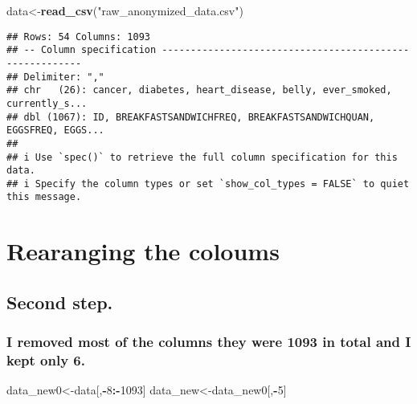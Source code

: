 \documentclass[
]{article}
\newenvironment{Shaded}{\begin{snugshade}}{\end{snugshade}}
\newcommand{\DecValTok}[1]{\textcolor[rgb]{0.00,0.00,0.81}{#1}}
\newcommand{\FunctionTok}[1]{\textcolor[rgb]{0.13,0.29,0.53}{\textbf{#1}}}
\newcommand{\NormalTok}[1]{#1}
\newcommand{\OtherTok}[1]{\textcolor[rgb]{0.56,0.35,0.01}{#1}}
\newcommand{\SpecialCharTok}[1]{\textcolor[rgb]{0.81,0.36,0.00}{\textbf{#1}}}
\newcommand{\StringTok}[1]{\textcolor[rgb]{0.31,0.60,0.02}{#1}}
\begin{document}
\begin{Shaded}
\begin{Highlighting}[]
\NormalTok{data}\OtherTok{\textless{}{-}}\FunctionTok{read\_csv}\NormalTok{(}\StringTok{"raw\_anonymized\_data.csv"}\NormalTok{)}
\end{Highlighting}
\end{Shaded}

\begin{verbatim}
## Rows: 54 Columns: 1093
## -- Column specification --------------------------------------------------------
## Delimiter: ","
## chr   (26): cancer, diabetes, heart_disease, belly, ever_smoked, currently_s...
## dbl (1067): ID, BREAKFASTSANDWICHFREQ, BREAKFASTSANDWICHQUAN, EGGSFREQ, EGGS...
## 
## i Use `spec()` to retrieve the full column specification for this data.
## i Specify the column types or set `show_col_types = FALSE` to quiet this message.
\end{verbatim}

\hypertarget{rearanging-the-coloums}{%
\section{\texorpdfstring{\textbf{Rearanging the
coloums}}{Rearanging the coloums}}\label{rearanging-the-coloums}}

\hypertarget{second-step.}{%
\subsection{Second step.}\label{second-step.}}

\hypertarget{i-removed-most-of-the-columns-they-were-1093-in-total-and-i-kept-only-6.}{%
\subsubsection{I removed most of the columns they were 1093 in total and
I kept only
6.}\label{i-removed-most-of-the-columns-they-were-1093-in-total-and-i-kept-only-6.}}

\begin{Shaded}
\begin{Highlighting}[]
\NormalTok{data\_new0}\OtherTok{\textless{}{-}}\NormalTok{data[,}\SpecialCharTok{{-}}\DecValTok{8}\SpecialCharTok{:{-}}\DecValTok{1093}\NormalTok{]}
\NormalTok{data\_new}\OtherTok{\textless{}{-}}\NormalTok{data\_new0[,}\SpecialCharTok{{-}}\DecValTok{5}\NormalTok{]}
\end{Highlighting}
\end{Shaded}
\end{document}
